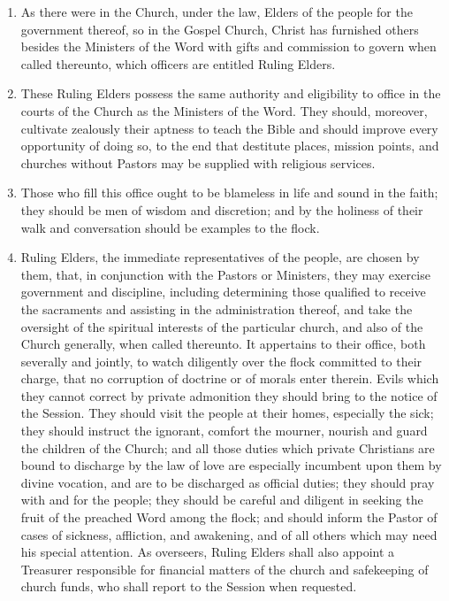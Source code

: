 \documentclass[
]{book}
\providecommand{\tightlist}{%
  \setlength{\itemsep}{0pt}\setlength{\parskip}{0pt}}
\begin{document}
\begin{enumerate}
\def\labelenumi{\arabic{enumi}.}
\tightlist
\item
  \protect\hypertarget{10}{\href{}{}}As there were in the Church, under the law, Elders of the people for the government thereof, so in the Gospel Church, Christ has furnished others besides the Ministers of the Word with gifts and commission to govern when called thereunto, which officers are entitled Ruling Elders.
\item
  These Ruling Elders possess the same authority and eligibility to office in the courts of the Church as the Ministers of the Word. They should, moreover, cultivate zealously their aptness to teach the Bible and should improve every opportunity of doing so, to the end that destitute places, mission points, and churches without Pastors may be supplied with religious services.
\item
  Those who fill this office ought to be blameless in life and sound in the faith; they should be men of wisdom and discretion; and by the holiness of their walk and conversation should be examples to the flock.
\item
  Ruling Elders, the immediate representatives of the people, are chosen by them, that, in conjunction with the Pastors or Ministers, they may exercise government and discipline, including determining those qualified to receive the sacraments and assisting in the administration thereof, and take the oversight of the spiritual interests of the particular church, and also of the Church generally, when called thereunto. It appertains to their office, both severally and jointly, to watch diligently over the flock committed to their charge, that no corruption of doctrine or of morals enter therein. Evils which they cannot correct by private admonition they should bring to the notice of the Session. They should visit the people at their homes, especially the sick; they should instruct the ignorant, comfort the mourner, nourish and guard the children of the Church; and all those duties which private Christians are bound to discharge by the law of love are especially incumbent upon them by divine vocation, and are to be discharged as official duties; they should pray with and for the people; they should be careful and diligent in seeking the fruit of the preached Word among the flock; and should inform the Pastor of cases of sickness, affliction, and awakening, and of all others which may need his special attention. As overseers, Ruling Elders shall also appoint a Treasurer responsible for financial matters of the church and safekeeping of church funds, who shall report to the Session when requested.
\end{enumerate}
\end{document}
